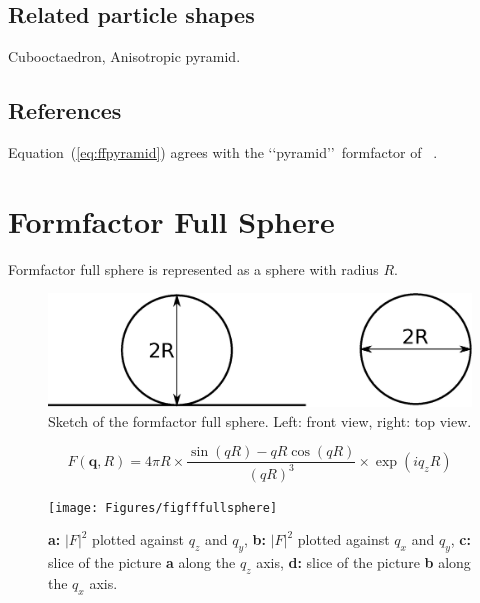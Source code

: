 \subsection{Related particle shapes}
Cubooctaedron, Anisotropic pyramid.

\subsection{References}
Equation~(\ref{eq:ffpyramid}) agrees with the \lq\lq pyramid\rq\rq ~formfactor of \IsGISAXS~\cite{Laz02}.


\newpage{\cleardoublepage}


\section{Formfactor Full Sphere}
Formfactor full sphere is represented as a sphere with radius $R$. 
\begin{figure}[ht]
\begin{center}
\includegraphics[width=0.6\columnwidth]{Figures/fullsphere}
\caption{Sketch of the formfactor full sphere. Left: front view, right: top view.}
\end{center}
\label{fullsphere}
\end{figure}

\begin{equation}
F(\mathbf q, R) = 4\pi R\times\frac{\sin(qR)-qR\cos(qR)}{(qR)^3}\times\exp\left(iq_zR\right)
\end{equation}

\begin{figure}[h]
\begin{center}
\texttt{[image: Figures/figfffullsphere]}
\end{center}
\caption{{\bf a:} $|F|^2$ plotted against $q_z$ and $q_y$, {\bf b:} $|F|^2$ plotted against $q_x$ and $q_y$, {\bf c:} slice of the picture {\bf a} along the $q_z$ axis, {\bf d:} slice of the picture {\bf b} along the $q_x$ axis.}
\end{figure}

\par

